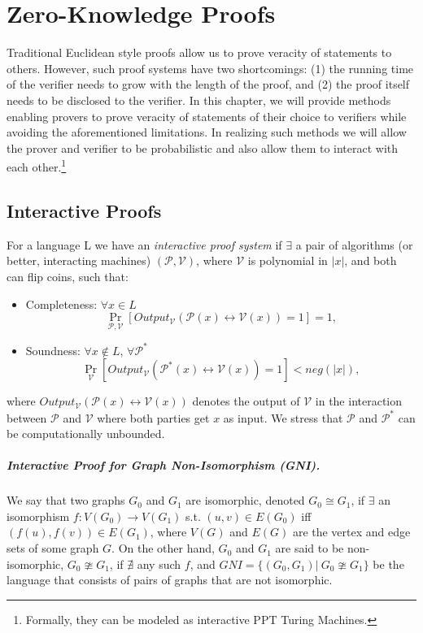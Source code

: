 
\chapter{Zero-Knowledge Proofs}
Traditional Euclidean style proofs allow us to prove veracity of statements to others. However, such proof systems have two shortcomings: (1) the running time of the verifier needs to grow with the length of the proof, and (2) the proof itself needs to be disclosed to the verifier. In this chapter, we will provide methods enabling provers to prove veracity of statements of their choice to verifiers while avoiding the aforementioned limitations. In realizing such methods we will allow the prover and verifier to be probabilistic and also allow them to interact with each other.\footnote{Formally, they can be modeled as interactive PPT Turing Machines.}

\section{Interactive Proofs}
		{ For a language L we have an \textit{interactive proof system} if $\exists$ a pair of algorithms (or better, interacting machines) $(\mathcal{P},\mathcal{V})$, where $\mathcal{V}$ is polynomial in $|x|$, and both can flip coins, such that:
		\begin{itemize}
			\item Completeness: $\forall x\in L$
		$$\Pr_{\mathcal{P},\mathcal{V}} \left[Output_{\mathcal{V}}(\mathcal{P}(x) \leftrightarrow \mathcal{V}(x))=1\right]=1,$$
			\item Soundness: $\forall x\notin L$, $\forall \mathcal{P}^*$
		$$\Pr_{\mathcal{V}} \left[Output_{\mathcal{V}}(\mathcal{P}^*(x) \leftrightarrow \mathcal{V}(x))=1\right]<neg(|x|),$$
		\end{itemize} where $Output_{\mathcal{V}}(\mathcal{P}(x) \leftrightarrow \mathcal{V}(x))$ denotes the output of $\mathcal{V}$ in the interaction between $\mathcal{P}$ and $\mathcal{V}$ where both parties get $x$ as input.
		We stress that $\mathcal{P}$ and $\mathcal{P}^*$ can be computationally unbounded. }



\paragraph{Interactive Proof for Graph Non-Isomorphism (GNI).} We say that two graphs $G_0$ and $G_1$ are isomorphic, denoted $G_0 \cong G_1$, if $\exists$ an isomorphism $f: V(G_0) \rightarrow V(G_1)$ s.t. $(u,v)\in E(G_0)$ iff $(f(u),f(v))\in E(G_1)$, where $V(G)$ and $E(G)$ are the vertex and edge sets of some graph $G$. On the other hand, $G_0$ and $G_1$ are said to be non-isomorphic, $G_0 \ncong G_1$, if $\nexists$ any such $f$, and $GNI=\lbrace(G_0,G_1)|\  G_0\ncong G_1\rbrace$ be the language that consists of pairs of graphs that are not isomorphic. 


